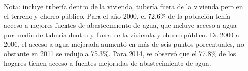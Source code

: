 Nota: incluye tubería dentro de la vivienda, tubería fuera de la vivienda pero en el terreno y chorro público. Para el año 2000, el 72.6\% de la población tenía acceso a mejores fuentes de abastecimiento de agua, que incluye acceso a agua por medio de tubería dentro y fuera de la vivienda y chorro público. De 2000 a 2006, el acceso a agua mejorada aumentó en más de seis puntos porcentuales, no obstante en 2011 se redujo a 75.3\%. Para 2014, se observó que el 77.8\% de los hogares tienen acceso a fuentes mejoradas de abastecimiento de agua.